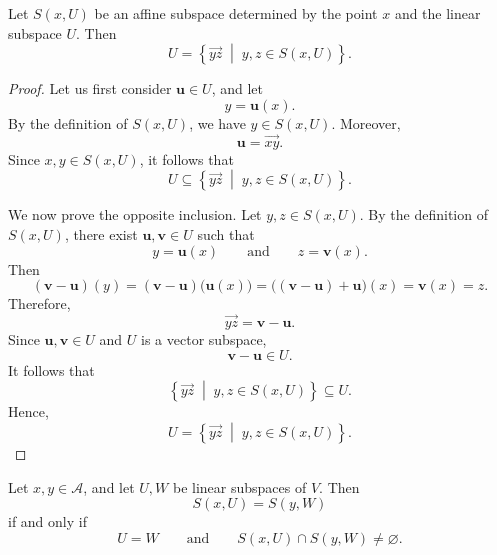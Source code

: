 \documentclass[12pt]{article}
\begin{document}
\begin{proposition}
Let \(S(x,U)\) be an affine subspace determined by the point \(x\) and
the linear subspace \(U\). Then
\[
U
=
\left\{
\overrightarrow{yz}
\;\middle|\;
y,z\in S(x,U)
\right\}.
\]
\end{proposition}

\begin{proof}
Let us first consider \(\mathbf{u}\in U\), and let
\[
y=\mathbf{u}(x).
\]
By the definition of \(S(x,U)\), we have \(y\in S(x,U)\). Moreover,
\[
\mathbf{u}=\overrightarrow{xy}.
\]
Since \(x,y\in S(x,U)\), it follows that
\[
U
\subseteq
\left\{
\overrightarrow{yz}
\;\middle|\;
y,z\in S(x,U)
\right\}.
\]

We now prove the opposite inclusion. Let \(y,z\in S(x,U)\). By the
definition of \(S(x,U)\), there exist \(\mathbf{u},\mathbf{v}\in U\)
such that
\[
y=\mathbf{u}(x)
\qquad\text{and}\qquad
z=\mathbf{v}(x).
\]
Then
\[
(\mathbf{v}-\mathbf{u})(y)
=
(\mathbf{v}-\mathbf{u})\bigl(\mathbf{u}(x)\bigr)
=
\bigl((\mathbf{v}-\mathbf{u})+\mathbf{u}\bigr)(x)
=
\mathbf{v}(x)
=
z.
\]
Therefore,
\[
\overrightarrow{yz}
=
\mathbf{v}-\mathbf{u}.
\]
Since \(\mathbf{u},\mathbf{v}\in U\) and \(U\) is a vector subspace,
\[
\mathbf{v}-\mathbf{u}\in U.
\]
It follows that
\[
\left\{
\overrightarrow{yz}
\;\middle|\;
y,z\in S(x,U)
\right\}
\subseteq U.
\]
Hence,
\[
U
=
\left\{
\overrightarrow{yz}
\;\middle|\;
y,z\in S(x,U)
\right\}.
\]
\end{proof}

\begin{proposition}
Let \(x,y\in \mathcal A\), and let \(U,W\) be linear subspaces of \(V\). Then
\[
S(x,U)=S(y,W)
\]
if and only if
\[
U=W
\qquad\text{and}\qquad
S(x,U)\cap S(y,W)\neq\varnothing.
\]
\end{proposition}
\end{document}
